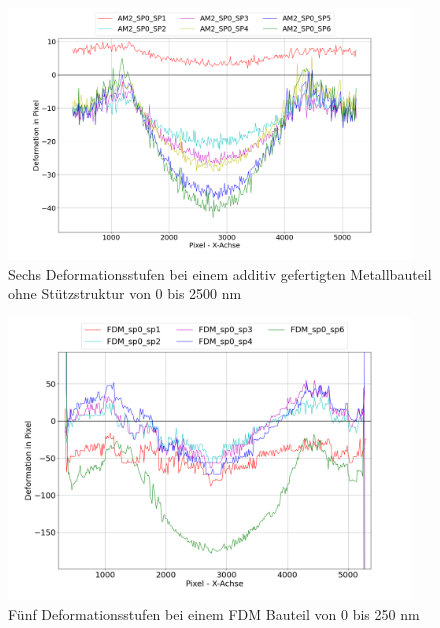 \begin{figure}[H]
  \centering
  \includegraphics[width=0.95\textwidth]{images/am2_all_defos.png}
  \caption{Sechs Deformationsstufen bei einem additiv gefertigten Metallbauteil ohne
  Stützstruktur von 0 bis 2500 nm}
  \label{fig:am_defos}
\end{figure}

\begin{figure}[H]
  \centering
  \includegraphics[width=0.95\textwidth]{images/fdm2_all_defos.png}
  \caption{Fünf Deformationsstufen bei einem FDM Bauteil von 0 bis 250 nm}
  \label{fig:fdm_defos}
\end{figure}

